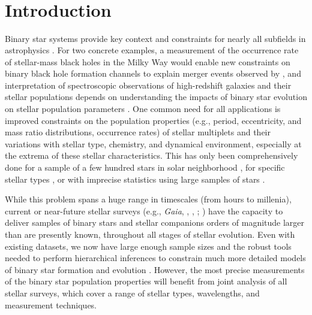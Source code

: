 \documentclass[modern]{aastex63}
\begin{document}

\section*{~}\clearpage
\section{Introduction} \label{sec:intro}

Binary star systems provide key context and constraints for nearly all subfields
in astrophysics \citep[e.g.,][]{Breivik:BAAS, Rix:BAAS}.
For two concrete examples, a measurement of the occurrence rate of stellar-mass
black holes in the Milky Way would enable new constraints on binary black hole
formation channels to explain merger events observed by 
\citep{LIGO:BH1, LIGO:catalog}, and interpretation of spectroscopic observations
of high-redshift galaxies and their stellar populations depends on understanding
the impacts of binary star evolution on stellar population parameters
\cite[e.g.,][]{Eldridge:2017}.
One common need for all applications is improved constraints on the population
properties (e.g., period, eccentricity, and mass ratio distributions, occurrence
rates) of stellar multiplets and their variations with stellar type, chemistry,
and dynamical environment, especially at the extrema of these stellar
characteristics.
This has only been comprehensively done for a sample of a few hundred stars in
solar neighborhood \citep{Raghavan:2010}, for specific stellar types
\citep[e.g.,][]{Moe:2017}, or with imprecise statistics using large samples of
stars \citep{Badenes:2018}.

While this problem spans a huge range in timescales (from hours to millenia),
current or near-future stellar surveys (e.g., \textit{Gaia}, \apogee,
, ; \citealt{Gaia-Collaboration:2016,
Gaia-Collaboration:2018, Majewski:2017, Zhao:2012, Kollmeier:2017}) have the
capacity to deliver samples of binary stars and stellar companions orders of
magnitude larger than are presently known, throughout all stages of stellar
evolution.
Even with existing datasets, we now have large enough sample sizes and the
robust tools needed to perform hierarchical inferences to constrain much more
detailed models of binary star formation and evolution \citep[e.g.,][]{Moe:2018,
El-Badry:2019a}.
However, the most precise measurements of the binary star population properties
will benefit from joint analysis of all stellar surveys, which cover a range of
stellar types, wavelengths, and measurement techniques.
\end{document}
